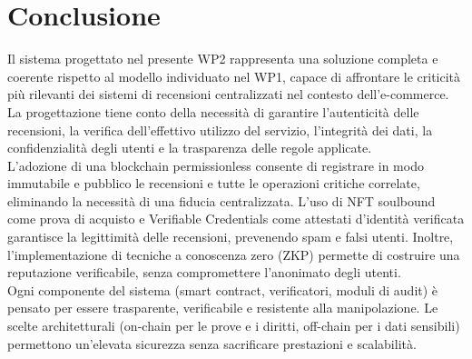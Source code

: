     \section{Conclusione}
        Il sistema progettato nel presente WP2 rappresenta una soluzione completa e coerente rispetto al modello individuato nel WP1, capace di affrontare le criticità più rilevanti dei sistemi di recensioni centralizzati nel contesto dell’e-commerce. La progettazione tiene conto della necessità di garantire l'autenticità delle recensioni, la verifica dell'effettivo utilizzo del servizio, l'integrità dei dati, la confidenzialità degli utenti e la trasparenza delle regole applicate. \\
        L'adozione di una blockchain permissionless consente di registrare in modo immutabile e pubblico le recensioni e tutte le operazioni critiche correlate, eliminando la necessità di una fiducia centralizzata. L'uso di NFT soulbound come prova di acquisto e Verifiable Credentials come attestati d'identità verificata garantisce la legittimità delle recensioni, prevenendo spam e falsi utenti. Inoltre, l'implementazione di tecniche a conoscenza zero (ZKP) permette di costruire una reputazione verificabile, senza compromettere l'anonimato degli utenti. \\
        Ogni componente del sistema (smart contract, verificatori, moduli di audit) è pensato per essere trasparente, verificabile e resistente alla manipolazione. Le scelte architetturali (on-chain per le prove e i diritti, off-chain per i dati sensibili) permettono un'elevata sicurezza senza sacrificare prestazioni e scalabilità.